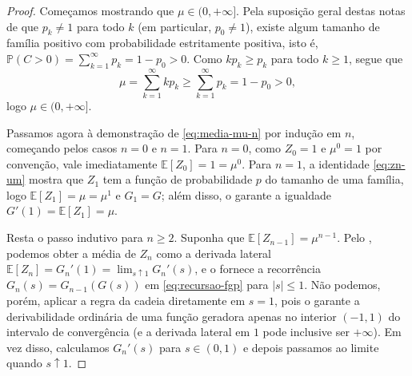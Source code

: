 \documentclass[12pt,portuguese]{article}
\theoremstyle{definition}
\theoremstyle{plainexercise}
\theoremstyle{starredexercise}
\theoremstyle{definition}
\begin{document}
\begin{proof}
Começamos mostrando que $\mu\in(0,+\infty]$. Pela suposição geral destas
notas de que $p_k\neq 1$ para todo $k$ (em particular, $p_0\neq 1$),
existe algum tamanho de família positivo com probabilidade estritamente
positiva, isto é, $\mathbb{P}(C>0)=\sum_{k=1}^{\infty}p_k=1-p_0>0$. Como
$kp_k\geqslant p_k$ para todo $k\geqslant 1$, segue que
\[
\mu=\sum_{k=1}^{\infty}kp_k\geqslant\sum_{k=1}^{\infty}p_k=1-p_0>0,
\]
logo $\mu\in(0,+\infty]$.

Passamos agora à demonstração de \eqref{eq:media-mu-n} por indução em $n$,
começando pelos casos $n=0$ e $n=1$. Para $n=0$, como $Z_0=1$ e $\mu^0=1$
por convenção, vale imediatamente $\mathbb{E}[Z_0]=1=\mu^0$. Para $n=1$,
a identidade \eqref{eq:zn-um} mostra que $Z_1$ tem a função de probabilidade $p$ do
tamanho de uma família, logo $\mathbb{E}[Z_1]=\mu=\mu^1$ e $G_1=G$; além
disso, o  garante a
igualdade $G'(1)=\mathbb{E}[Z_1]=\mu$.

Resta o passo indutivo para $n\geqslant 2$. Suponha que
$\mathbb{E}[Z_{n-1}]=\mu^{n-1}$. Pelo , podemos
obter a média de $Z_n$ como a derivada lateral
$\mathbb{E}[Z_n]=G_n'(1)=\lim_{s\uparrow 1}G_n'(s)$, e o
 fornece a recorrência $G_n(s)=G_{n-1}(G(s))$ em
\eqref{eq:recursao-fgp} para $|s|\leqslant 1$. Não podemos, porém,
aplicar a regra da cadeia diretamente em $s=1$, pois o
 garante a derivabilidade ordinária de uma função
geradora apenas no interior $(-1,1)$ do intervalo de convergência (e a
derivada lateral em $1$ pode inclusive ser $+\infty$). Em vez disso,
calculamos $G_n'(s)$ para $s\in(0,1)$ e depois passamos ao limite quando
$s\uparrow 1$.


\end{proof}
\end{document}
